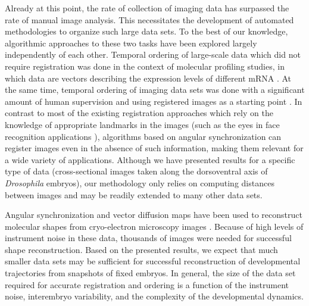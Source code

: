 \documentclass[twocolumn, 10pt]{article}
\begin{document}
Already at this point, the rate of collection of imaging data has surpassed the rate of manual image analysis.
%
This necessitates the development of automated methodologies to organize such large data sets. 
%
To the best of our knowledge, algorithmic approaches to these two tasks have been explored largely independently of each other. 
%
Temporal ordering of large-scale data which did not require registration was done in the context of molecular profiling studies, in which data are vectors describing the expression levels of different mRNA \citep{anavy2014blind, trapnell2014dynamics, gupta2008extracting}.
%
At the same time, temporal ordering of imaging data sets was done with a significant amount of human supervision and using registered images as a starting point \citep{yuan2014automated, surkova2008characterization}.  
%
%
In contrast to most of the existing registration approaches which rely on the knowledge of appropriate landmarks in the images \citep{ian1998statistical} (such as the eyes in face recognition applications \citep{zhao2003face}), algorithms based on angular synchronization can register images even in the absence of such information, making them relevant for a wide variety of applications. 
%
Although we have presented results for a specific type of data (cross-sectional images taken along the dorsoventral axis of {\em Drosophila} embryos), our methodology only relies on computing distances between images and may be readily extended to many other data sets. 

Angular synchronization and vector diffusion maps have been used to reconstruct molecular shapes from cryo-electron microscopy images \citep{singer2012vector, zhao2014rotationally, singer2011viewing}.
%
Because of high levels of instrument noise in these data, thousands of images were needed for successful shape reconstruction. 
%
Based on the presented results, we expect that much smaller data sets may be sufficient for successful reconstruction of developmental trajectories from snapshots of fixed embryos.
%
In general, the size of the data set required for accurate registration and ordering is a function of the instrument noise, interembryo variability, and the complexity of the developmental dynamics.
%
\end{document}
